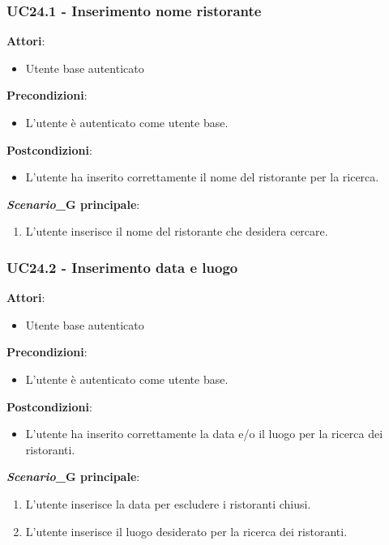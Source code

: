 \subsubsection{UC24.1 - Inserimento nome ristorante
}\label{usecase:24_1}
\textbf{Attori}:
\begin{itemize}
    \item Utente base autenticato
\end{itemize}
\textbf{Precondizioni}:
\begin{itemize}
    \item L'utente è autenticato come utente base.
\end{itemize}
\textbf{Postcondizioni}:
\begin{itemize}
    \item L'utente ha inserito correttamente il nome del ristorante per la ricerca.
\end{itemize}
\textbf{\textit{Scenario}_G principale}:
\begin{enumerate}
    \item L'utente inserisce il nome del ristorante che desidera cercare.
\end{enumerate}

\subsubsection{UC24.2 - Inserimento data e luogo
}\label{usecase:24_2}
\textbf{Attori}:
\begin{itemize}
    \item Utente base autenticato
\end{itemize}
\textbf{Precondizioni}:
\begin{itemize}
    \item L'utente è autenticato come utente base.
\end{itemize}
\textbf{Postcondizioni}:
\begin{itemize}
    \item L'utente ha inserito correttamente la data e/o il luogo per la ricerca dei ristoranti.
\end{itemize}
\textbf{\textit{Scenario}_G principale}:
\begin{enumerate}
    \item L'utente inserisce la data per escludere i ristoranti chiusi.
    \item L'utente inserisce il luogo desiderato per la ricerca dei ristoranti.
\end{enumerate}


